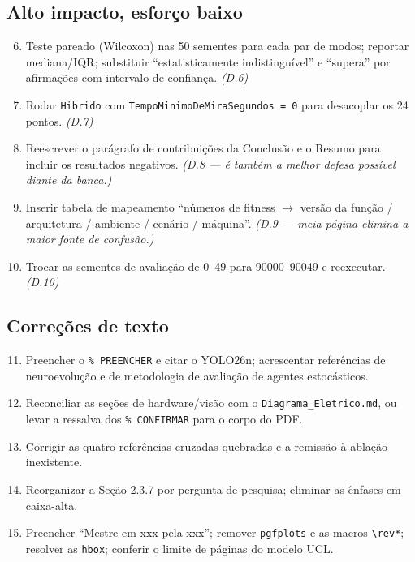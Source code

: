 \documentclass[11pt,a4paper]{article}
\begin{document}
\subsection*{Alto impacto, esforço baixo}

\begin{enumerate}\setcounter{enumi}{5}
  \item Teste pareado (Wilcoxon) nas 50 sementes para cada par de modos; reportar mediana/IQR;
  substituir ``estatisticamente indistinguível'' e ``supera'' por afirmações com intervalo de
  confiança. \emph{(D.6)}
  \item Rodar \texttt{Hibrido} com \texttt{TempoMinimoDeMiraSegundos = 0} para desacoplar os 24
  pontos. \emph{(D.7)}
  \item Reescrever o parágrafo de contribuições da Conclusão e o Resumo para incluir os resultados
  negativos. \emph{(D.8 --- é também a melhor defesa possível diante da banca.)}
  \item Inserir tabela de mapeamento ``números de fitness $\rightarrow$ versão da função / arquitetura
  / ambiente / cenário / máquina''. \emph{(D.9 --- meia página elimina a maior fonte de confusão.)}
  \item Trocar as sementes de avaliação de 0--49 para 90000--90049 e reexecutar. \emph{(D.10)}
\end{enumerate}

\subsection*{Correções de texto}

\begin{enumerate}\setcounter{enumi}{10}
  \item Preencher o \texttt{\% PREENCHER} e citar o YOLO26n; acrescentar referências de neuroevolução
  e de metodologia de avaliação de agentes estocásticos.
  \item Reconciliar as seções de hardware/visão com o \texttt{Diagrama\_Eletrico.md}, ou levar a
  ressalva dos \texttt{\% CONFIRMAR} para o corpo do PDF.
  \item Corrigir as quatro referências cruzadas quebradas e a remissão à ablação inexistente.
  \item Reorganizar a Seção 2.3.7 por pergunta de pesquisa; eliminar as ênfases em caixa-alta.
  \item Preencher ``Mestre em xxx pela xxx''; remover \texttt{pgfplots} e as macros
  \texttt{\textbackslash rev*}; resolver as \texttt{hbox}; conferir o limite de páginas do modelo UCL.
\end{enumerate}
\end{document}
